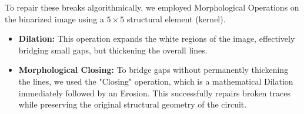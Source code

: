 To repair these breaks algorithmically, we employed Morphological Operations on the binarized image using a $5 \times 5$ structural element (kernel).
\begin{itemize}
    \item \textbf{Dilation:} This operation expands the white regions of the image, effectively bridging small gaps, but thickening the overall lines.
    \item \textbf{Morphological Closing:} To bridge gaps without permanently thickening the lines, we used the "Closing" operation, which is a mathematical Dilation immediately followed by an Erosion. This successfully repairs broken traces while preserving the original structural geometry of the circuit.
\end{itemize}
